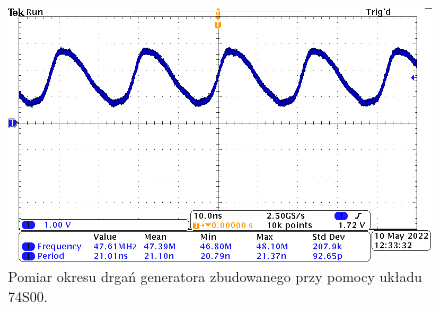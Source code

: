 \begin{figure}[H]
    \centering
    \includegraphics[width=\textwidth]{include/4/2.png}
    \caption{Pomiar okresu drgań generatora zbudowanego przy pomocy układu 74S00.}
\end{figure}